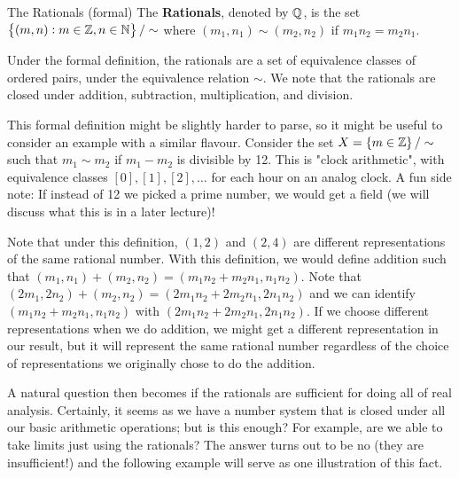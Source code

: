 \begin{ndef}{The Rationals (formal)}
    The \textbf{Rationals}, denoted by $\mathbb{Q}$, is the set $\set{(m, n): m \in \mathbb{Z}, n \in \mathbb{N}}/\sim$ where $(m_1, n_1) \sim (m_2, n_2)$ if $m_1n_2 = m_2n_1$.
\end{ndef}
\noindent Under the formal definition, the rationals are a set of equivalence classes of ordered pairs, under the equivalence relation $\sim$. We note that the rationals are closed under addition, subtraction, multiplication, and division.

This formal definition might be slightly harder to parse, so it might be useful to consider an example with a similar flavour. Consider the set $X = \set{m \in \mathbb{Z}}/\sim$ such that $m_1 \sim m_2$ if $m_1 - m_2$ is divisible by 12. This is "clock arithmetic", with equivalence classes $[0], [1], [2], \ldots$ for each hour on an analog clock. A fun side note: If instead of 12 we picked a prime number, we would get a field (we will discuss what this is in a later lecture)!

Note that under this definition, $(1, 2)$ and $(2, 4)$ are different representations of the same rational number. With this definition, we would define addition such that $(m_1, n_1) + (m_2, n_2) = (m_1n_2 + m_2n_1, n_1n_2)$. Note that $(2m_1, 2n_2) + (m_2, n_2) = (2m_1n_2 + 2m_2n_1, 2n_1n_2)$ and we can identify $(m_1n_2 + m_2n_1, n_1n_2)$ with $(2m_1n_2 + 2m_2n_1, 2n_1n_2)$. If we choose different representations when we do addition, we might get a different representation in our result, but it will represent the same rational number regardless of the choice of representations we originally chose to do the addition. 

A natural question then becomes if the rationals are sufficient for doing all of real analysis. Certainly, it seems as we have a number system that is closed under all our basic arithmetic operations; but is this enough? For example, are we able to take limits just using the rationals? The answer turns out to be no (they are insufficient!) and the following example will serve as one illustration of this fact. 

